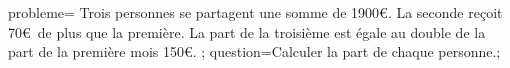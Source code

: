 \documentclass[exercice]{thedocument}%
\begin{document}
%
    \>probleme={%
    Trois personnes se partagent une somme de 1900\euro. La seconde reçoit
    70\euro\ de plus que la première. La part de la troisième est égale au
    double de la part de la première mois 150\euro.%
    };%
    \>question=Calculer la part de chaque personne.;%
\end{document}
